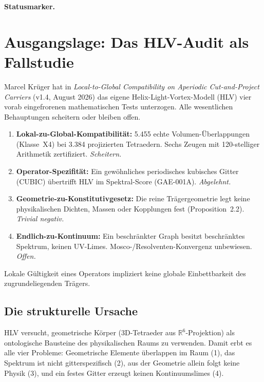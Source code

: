 \medskip\noindent\textbf{Statusmarker.}


\section{Ausgangslage: Das HLV-Audit als Fallstudie}
\label{sec:hlv}

Marcel Krüger hat in \emph{Local-to-Global Compatibility on Aperiodic
Cut-and-Project Carriers} (v1.4, August 2026) das eigene Helix-Light-Vortex-Modell
(HLV) vier vorab eingefrorenen mathematischen Tests unterzogen.
Alle wesentlichen Behauptungen scheitern oder bleiben offen.

\begin{enumerate}
  \item \textbf{Lokal-zu-Global-Kompatibilität:}
    5.455 echte Volumen-Überlappungen (Klasse~X4) bei 3.384 projizierten
    Tetraedern. Sechs Zeugen mit 120-stelliger Arithmetik zertifiziert.
    \emph{Scheitern.} \E
  \item \textbf{Operator-Spezifität:}
    Ein gewöhnliches periodisches kubisches Gitter (CUBIC) übertrifft
    HLV im Spektral-Score (GAE-001A). \emph{Abgelehnt.} \E
  \item \textbf{Geometrie-zu-Konstitutivgesetz:}
    Die reine Trägergeometrie legt keine physikalischen Dichten,
    Massen oder Kopplungen fest (Proposition~2.2).
    \emph{Trivial negativ.} \E
  \item \textbf{Endlich-zu-Kontinuum:}
    Ein beschränkter Graph besitzt beschränktes Spektrum, keinen
    UV-Limes. Mosco-/Resolventen-Konvergenz unbewiesen. \emph{Offen.} \E
\end{enumerate}

\begin{tcolorbox}[warnbox,title={Korollar (Krüger 4.5) \E}]
  Lokale Gültigkeit eines Operators impliziert keine globale
  Einbettbarkeit des zugrundeliegenden Trägers.
\end{tcolorbox}

\subsection{Die strukturelle Ursache}

HLV versucht, geometrische Körper (3D-Tetraeder aus $\mathbb{R}^6$-Projektion)
als ontologische Bausteine des physikalischen Raums zu verwenden.
Damit erbt es alle vier Probleme:
Geometrische Elemente überlappen im Raum (1),
das Spektrum ist nicht gitterspezifisch (2),
aus der Geometrie allein folgt keine Physik (3),
und ein festes Gitter erzeugt keinen Kontinuumslimes (4).

